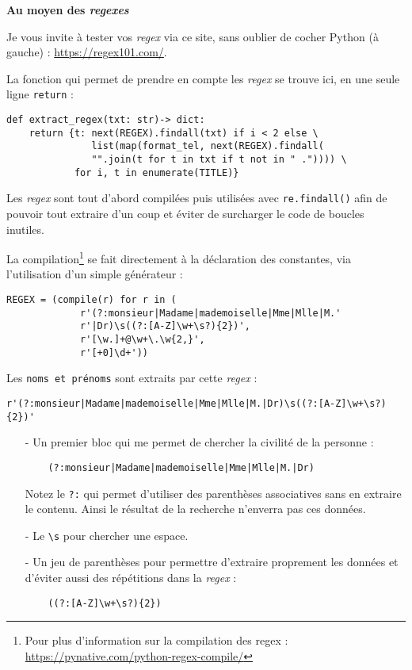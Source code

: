 \textbf{\textbullet{} Au moyen des \textit{regexes}}
\medskip

Je vous invite à tester vos \textit{regex} via ce site, sans oublier de cocher Python (à gauche) : \url{https://regex101.com/}.
\medskip

La fonction qui permet de prendre en compte les \textit{regex} se trouve ici, en une seule ligne \texttt{return} :
\begin{lstlisting}
def extract_regex(txt: str)-> dict:
    return {t: next(REGEX).findall(txt) if i < 2 else \
               list(map(format_tel, next(REGEX).findall(
               "".join(t for t in txt if t not in " .")))) \
            for i, t in enumerate(TITLE)}
\end{lstlisting}
\medskip

Les \textit{regex} sont tout d'abord compilées puis utilisées avec \texttt{re.findall()} afin de pouvoir tout extraire d'un coup et éviter de surcharger le code de boucles inutiles.
\medskip

La compilation\footnote{Pour plus d'information sur la compilation des regex : \url{https://pynative.com/python-regex-compile/}} se fait directement à la déclaration des constantes, via l'utilisation d'un simple générateur :
\begin{lstlisting}
REGEX = (compile(r) for r in (
             r'(?:monsieur|Madame|mademoiselle|Mme|Mlle|M.'
             r'|Dr)\s((?:[A-Z]\w+\s?){2})',
             r'[\w.]+@\w+\.\w{2,}',
             r'[+0]\d+'))
\end{lstlisting}
\medskip

Les \texttt{noms et prénoms} sont extraits par cette \textit{regex} :
\begin{verbatim}
r'(?:monsieur|Madame|mademoiselle|Mme|Mlle|M.|Dr)\s((?:[A-Z]\w+\s?){2})'
\end{verbatim}
\medskip

\begin{itemize}
	\item[-] Un premier bloc qui me permet de chercher la civilité de la personne :
	\begin{verbatim}
	(?:monsieur|Madame|mademoiselle|Mme|Mlle|M.|Dr)
	\end{verbatim}
	Notez le \texttt{?:} qui permet d'utiliser des parenthèses associatives sans en extraire le contenu. Ainsi le résultat de la recherche n'enverra pas ces données.
	\medskip
	
	\item[-] Le \texttt{\textbackslash{}s} pour chercher une espace.
	\medskip
	
	\item[-] Un jeu de parenthèses pour permettre d'extraire proprement les données et d'éviter aussi des répétitions dans la \textit{regex} :
	\begin{verbatim}
	((?:[A-Z]\w+\s?){2})
	\end{verbatim}	
\end{itemize}
\medskip

